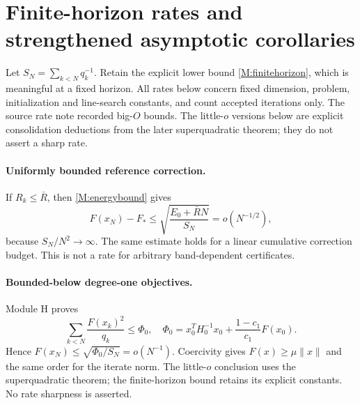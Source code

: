 \section{Finite-horizon rates and strengthened asymptotic corollaries}
Let $S_N=\sum_{k<N}q_k^{-1}$. Retain the explicit lower bound \eqref{M:finitehorizon}, which is meaningful at a fixed horizon. All rates below concern fixed dimension, problem, initialization and line-search constants, and count accepted iterations only. The source rate note recorded big-$O$ bounds. The little-$o$ versions below are explicit consolidation deductions from the later superquadratic theorem; they do not assert a sharp rate.

\paragraph{Uniformly bounded reference correction.}
If $R_k\le\bar R$, then \eqref{M:energybound} gives
\[
 F(x_N)-F_*\le\sqrt{\frac{E_0+\bar RN}{S_N}}=o(N^{-1/2}),
\]
because $S_N/N^2\to\infty$. The same estimate holds for a linear cumulative correction budget. This is not a rate for arbitrary band-dependent certificates.

\paragraph{Bounded-below degree-one objectives.}
Module H proves
\[
 \sum_{k<N}\frac{F(x_k)^2}{q_k}\le\Phi_0,
\quad \Phi_0=x_0^TH_0^{-1}x_0+\frac{1-c_1}{c_1}F(x_0).
\]
Hence $F(x_N)\le\sqrt{\Phi_0/S_N}=o(N^{-1})$. Coercivity gives $F(x)\ge\mu\|x\|$ and the same order for the iterate norm. The little-$o$ conclusion uses the superquadratic theorem; the finite-horizon bound retains its explicit constants. No rate sharpness is asserted.

